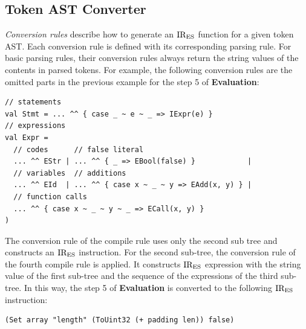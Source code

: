 \subsection{Token AST Converter}
\textit{Conversion rules} describe how to generate an \( \text{IR}_\text{ES} \) function for a
given token AST.  Each conversion rule is defined with its corresponding parsing
rule.  For basic parsing rules, their conversion rules always return the string
values of the contents in parsed tokens.  For example, the following conversion
rules are the omitted parts in the previous example for the step 5 of
\textbf{Evaluation}:
\begin{lstlisting}[style=myScalastyle]
// statements
val Stmt = ... ^^ { case _ ~ e ~ _ => IExpr(e) }
// expressions
val Expr =
  // codes      // false literal
  ... ^^ EStr | ... ^^ { _ => EBool(false) }            |
  // variables  // additions
  ... ^^ EId  | ... ^^ { case x ~ _ ~ y => EAdd(x, y) } |
  // function calls
  ... ^^ { case x ~ _ ~ y ~ _ => ECall(x, y) }
)
\end{lstlisting}
The conversion rule of the  compile rule uses only the second sub
tree and constructs an  \( \text{IR}_\text{ES} \) instruction.  For the second
sub-tree, the conversion rule of the fourth  compile rule is
applied. It constructs  \( \text{IR}_\text{ES} \) expression with the string value
of the first sub-tree and the sequence of the expressions of the third sub-tree.
In this way, the step 5 of \textbf{Evaluation} is converted to the following \(
\text{IR}_\text{ES} \) instruction:
\begin{lstlisting}[style=ires]
(Set array "length" (ToUint32 (+ padding len)) false)
\end{lstlisting}

